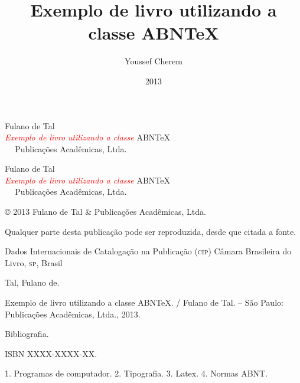 \documentclass[11pt,a5paper]{memoir}
\title{Exemplo de livro utilizando a classe ABN\TeX}
\author{Youssef Cherem}
\date{2013}
\begin{document}
\begin{titlingpage}

\phantom{xxx}
\vspace{0.5cm}
\huge
\raggedright
Fulano de Tal\\
\vspace{2.5cm}
\Huge 
{\raggedleft
\textit{\textcolor{red}{Exemplo de livro utilizando a classe}} ABN\TeX\\[1cm]
}
\centering 

\vfill
\Large
 Publicações Acadêmicas, Ltda.

\end{titlingpage}

\begin{titlingpage}

\phantom{xxx}
\vspace{0.5cm}
\huge
\raggedright
Fulano de Tal\\
\vspace{2.5cm}
\Huge 
{\raggedleft
\textit{\textcolor{red}{Exemplo de livro utilizando a classe}} ABN\TeX\\[1cm]
}
\centering 

\vfill
\Large
 Publicações Acadêmicas, Ltda.

\clearpage
\footnotesize
© 2013 Fulano de Tal \& Publicações Acadêmicas, Ltda.

Qualquer parte desta publicação pode ser reproduzida, desde que citada a fonte.

\bigskip

\begin{center}
Dados Internacionais de Catalogação na Publicação (\textsc{cip})
Câmara Brasileira do Livro, \textsc{sp}, Brasil
\end{center}

\begin{mdframed}
\noindent Tal, Fulano de.

Exemplo de livro utilizando a classe ABN\TeX. / Fulano de Tal. -- São Paulo: Publicações Acadêmicas, Ltda., 2013.

\medskip

Bibliografia.

ISBN XXXX-XXXX-XX.

\medskip

1. Programas de computador. 2. Tipografia. 3. Latex. 4. Normas ABNT.

\end{mdframed}

\end{titlingpage}
\end{document}
